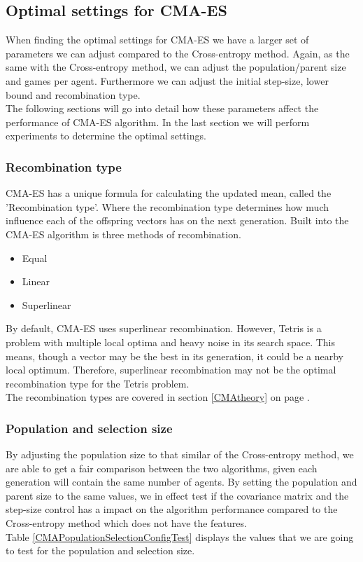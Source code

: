 \subsection{Optimal settings 
for CMA-ES \label{optimalsettingscma}}

When finding the optimal settings for CMA-ES we have a larger set of parameters we can adjust compared
to the Cross-entropy method. Again, as the same with the Cross-entropy method, we can adjust the population/parent size and
games per agent. Furthermore we can adjust the initial step-size, lower bound and recombination type.\\
The following sections will go into detail how these parameters affect the performance of CMA-ES
algorithm. In the last section we will perform experiments to determine the optimal settings.

\newpage
\subsubsection{Recombination type}
CMA-ES has a unique formula for calculating the updated mean,
called the 'Recombination type'. Where the recombination type
determines how much influence each of the offspring vectors has on the next
generation. Built into the CMA-ES algorithm is three methods of recombination. 
\begin{itemize}
\item Equal
\item Linear
\item Superlinear
\end{itemize}
By default, CMA-ES uses superlinear recombination. However, Tetris is a problem
with multiple local optima and heavy noise in its search space. This means, though a vector may be the best in its generation, it could be a nearby local optimum. Therefore, superlinear recombination may not be the optimal recombination type for the Tetris problem.\\

The recombination types are covered in section \ref{CMAtheory} on 
page \pageref{eq:recomType}.


\subsubsection{Population and selection size}
By adjusting the population size to that similar of the Cross-entropy method, we are able
to get a fair comparison between the two algorithms, given each generation will
contain the same number of agents. By setting the population and parent size
to the same values, we in effect test if the covariance matrix and the step-size
control has a impact on the algorithm performance compared to the Cross-entropy method
which does not have the features.\\
Table \ref{CMAPopulationSelectionConfigTest} displays the values that we are going
to test for the population and selection size.


